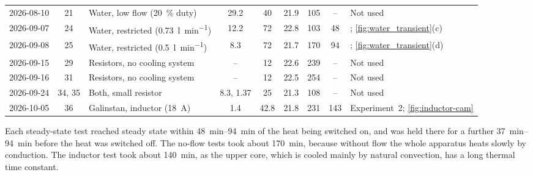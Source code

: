 \begin{table}[htbp]
\begin{tabularx}{\linewidth}{@{}l c >{\raggedright\arraybackslash}p{3.6cm}
      c c c c c L@{}}
    2026-08-10 & 21     & Water, low flow (\SI{20}{\percent} duty) & 29.2 & 40 & 21.9 & 105 & -- & Not used \\
    2026-09-07 & 24     & Water, restricted (\SI{0.73}{\litre\per\minute}) & 12.2 & 72 & 22.8 & 103 & 48 & ; \cref{fig:water_transient}(c) \\
    2026-09-08 & 25     & Water, restricted (\SI{0.5}{\litre\per\minute}) & 8.3 & 72 & 21.7 & 170 & 94 & ; \cref{fig:water_transient}(d) \\
    2026-09-15 & 29     & Resistors, no cooling system & --  & 12  & 22.6 & 239 & --  & Not used \\
    2026-09-16 & 31     & Resistors, no cooling system & --  & 12  & 22.5 & 254 & --  & Not used \\
    2026-09-24 & 34, 35 & Both, small resistor      & 8.3, 1.37 & 25 & 21.3 & 108 & -- & Not used \\
    2026-10-05 & 36     & Galinstan, inductor (\SI{18}{\ampere}) & 1.4 & 42.8 & 21.8 & 231 & 143 & Experiment~2; \cref{fig:inductor-cam} \\
    \bottomrule
  \end{tabularx}
\end{table}

Each steady-state test reached steady state within \SIrange{48}{94}{\minute} of
the heat being switched on, and was held there for a further
\SIrange{37}{94}{\minute} before the heat was switched off. The no-flow tests
took about \SI{170}{\minute}, because without flow the whole apparatus heats
slowly by conduction. The inductor test took about \SI{140}{\minute}, as the
upper core, which is cooled mainly by natural convection, has a long thermal time
constant.

